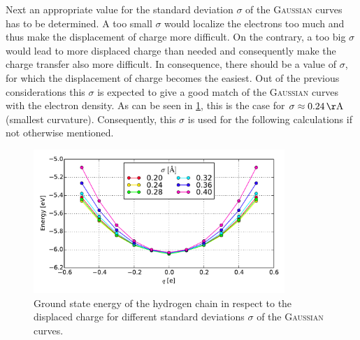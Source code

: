 Next an appropriate value for the standard deviation $\sigma$ of the \textsc{Gaussian} curves has to be determined. A too small $\sigma$ would localize the electrons too much and thus make the displacement of charge more difficult. On the contrary, a too big $\sigma$ would lead to more displaced charge than needed and consequently make the charge transfer also more difficult. In consequence, there should be a value of $\sigma$, for which the displacement of charge becomes the easiest. Out of the previous considerations this $\sigma$ is expected to give a good match of the \textsc{Gaussian} curves with the electron density. As can be seen in \cref{image_gaussian_sigmas_hydrogen}, this is the case for $\sigma \approx \unit[0.24]{\AA}$ (smallest curvature). Consequently, this $\sigma$ is used for the following calculations if not otherwise mentioned.\\
\begin{figure}[!t]
	\centering
	\includegraphics[width = 9.5cm]{Images/Hydrogen/charging/gaussian_sigmas}
	\caption{Ground state energy of the hydrogen chain in respect to the displaced charge for different standard deviations $\sigma$ of the \textsc{Gaussian} curves.}
	\label{image_gaussian_sigmas_hydrogen}
\end{figure}
